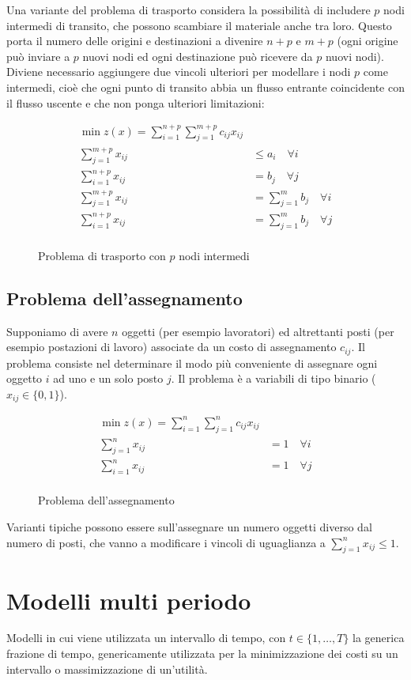 \documentclass[\main/main.tex]{subfiles}
\begin{document}
Una variante del problema di trasporto considera la possibilità di includere $p$ nodi intermedi di transito, che possono scambiare il materiale anche tra loro. Questo porta il numero delle origini e destinazioni a divenire $n+p$ e $m+p$ (ogni origine può inviare a $p$ nuovi nodi ed ogni destinazione può ricevere da $p$ nuovi nodi). Diviene necessario aggiungere due vincoli ulteriori per modellare i nodi $p$ come intermedi, cioè che ogni punto di transito abbia un flusso entrante coincidente con il flusso uscente e che non ponga ulteriori limitazioni:


\begin{figure}
	\begin{align*}
		\min z(x) = \sum_{i=1}^{n+p}\sum_{j=1}^{m+p} c_{ij}x_{ij}       \\
		\sum_{j=1}^{m+p} x_{ij} & \leq a_i \quad \forall i              \\
		\sum_{i=1}^{n+p} x_{ij} & = b_j    \quad \forall j              \\
		\sum_{j=1}^{m+p} x_{ij} & = \sum_{j=1}^m b_j    \quad \forall i \\
		\sum_{i=1}^{n+p} x_{ij} & = \sum_{j=1}^m b_j    \quad \forall j \\
	\end{align*}
	\caption{Problema di trasporto con $p$ nodi intermedi}
\end{figure}

\subsection{Problema dell'assegnamento}
Supponiamo di avere $n$ oggetti (per esempio lavoratori) ed altrettanti posti (per esempio postazioni di lavoro) associate da un costo di assegnamento $c_{ij}$. Il problema consiste nel determinare il modo più conveniente di assegnare ogni oggetto $i$ ad uno e un solo posto $j$. Il problema è a variabili di tipo binario ($x_{ij} \in \{0,1\}$).

\begin{figure}
	\begin{align*}
		\min z(x) = \sum_{i=1}^n\sum_{j=1}^n c_{ij}x_{ij} \\
		\sum_{j=1}^n x_{ij} & = 1 \quad \forall i         \\
		\sum_{i=1}^n x_{ij} & = 1  \quad \forall j        \\
	\end{align*}
	\caption{Problema dell'assegnamento}
\end{figure}

Varianti tipiche possono essere sull'assegnare un numero oggetti diverso dal numero di posti, che vanno a modificare i vincoli di uguaglianza a $\sum_{j=1}^n x_{ij} \leq 1$.

\section{Modelli multi periodo}
Modelli in cui viene utilizzata un intervallo di tempo, con $t \in \{1, \ldots, T\}$ la generica frazione di tempo, genericamente utilizzata per la minimizzazione dei costi su un intervallo o massimizzazione di un'utilità.
\end{document}
